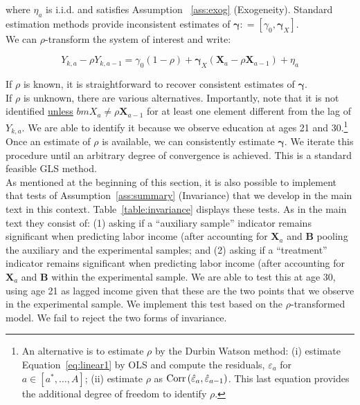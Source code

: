 \noindent where $\eta_{a}$ is i.i.d. and satisfies Assumption ~\ref{ass:exog} (Exogeneity). Standard estimation methods provide inconsistent estimates of $\bm{\gamma} : = [\gamma_{0}, \bm{\gamma}_{X}]$.\\

\noindent We can $\rho$-transform the system of interest and write: 


\begin{equation}
Y_{k,a} - \rho Y_{k,a-1} = \gamma_{0} \left( 1 - \rho \right) + \bm{\gamma}_{X} \left( \bm{X}_{a} - \rho \bm{X}_{a-1} \right) + \eta_{a}
\end{equation}

\noindent If $\rho$ is known, it is straightforward to recover consistent estimates of $\bm{\gamma}$.\\

\noindent If $\rho$ is unknown, there are various alternatives. Importantly, note that it is not identified \underline{unless} $bm{X}_{a} \neq \rho \bm{X}_{a-1}$ for at least one element different from the lag of $Y_{k,a} $. We are able to identify it because we observe education at ages 21 and 30.\footnote{An alternative is to estimate $\rho$ by the Durbin Watson method: (i) estimate Equation~\eqref{eq:linear1} by OLS and compute the residuals, $\varepsilon_{a}$ for $a \in [a^*, \ldots, A]$; (ii) estimate $\rho$ as  $\operatorname{Corr} \left( \hat{\varepsilon}_{a}, \hat{\varepsilon}_{a-1} \right)$. This last equation provides the additional degree of freedom to identify $\rho$.}\\ 

\noindent Once an estimate of $\rho$ is available, we can consistently estimate $\bm{\gamma}$. We iterate this procedure until an arbitrary degree of convergence is achieved. This is a standard feasible GLS method.\\ 

\noindent As mentioned at the beginning of this section, it is also possible to implement that tests of Assumption~\ref{ass:summary} (Invariance)  that we develop in the main text in this context. Table~\ref{table:invariance} displays these tests. As in the main text they consist of: (1) asking if a ``auxiliary sample'' indicator remains significant when predicting labor income (after accounting for $\bm{X}_{a}$ and $\bm{B}$ pooling the auxiliary and the experimental samples; and (2) asking if a ``treatment'' indicator remains significant when predicting labor income (after accounting for $\bm{X}_{a}$ and $\bm{B}$ within the experimental sample. We are able to test this at age 30, using age 21 as lagged income given that these are the two points that we observe in the experimental sample. We implement this test based on the $\rho$-transformed model. We fail to reject the two forms of invariance.\\

